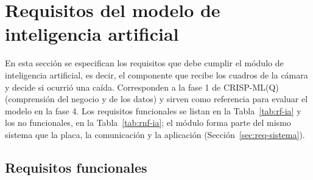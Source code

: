 \documentclass[12pt,a4paper,oneside]{book}
\theoremstyle{plain}
\theoremstyle{definition}
\theoremstyle{remark}
\begin{document}
\section{Requisitos del modelo de inteligencia artificial}
\label{sec:req-ia}

En esta sección se especifican los requisitos que debe cumplir el módulo de inteligencia artificial, es decir, el componente que recibe los cuadros de la cámara y decide si ocurrió una caída. Corresponden a la fase 1 de CRISP-ML(Q) (comprensión del negocio y de los datos) y sirven como referencia para evaluar el modelo en la fase 4. Los requisitos funcionales se listan en la Tabla~\ref{tab:rf-ia} y los no funcionales, en la Tabla~\ref{tab:rnf-ia}; el módulo forma parte del mismo sistema que la placa, la comunicación y la aplicación (Sección~\ref{sec:req-sistema}).

\subsection{Requisitos funcionales}
\end{document}

